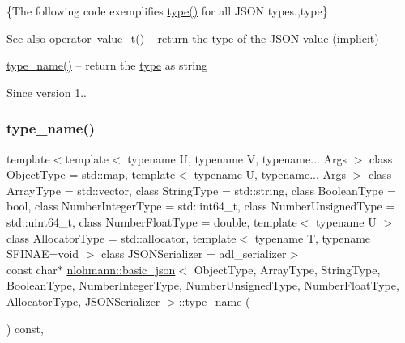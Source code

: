 \{The following code exemplifies {\ttfamily \mbox{\hyperlink{classnlohmann_1_1basic__json_a2b2d781d7f2a4ee41bc0016e931cadf7}{type()}}} for all J\+S\+ON types.,type\}

\begin{DoxySeeAlso}{See also}
\mbox{\hyperlink{classnlohmann_1_1basic__json_a26ef3058e249f82a04f8ec18f7419027}{operator value\+\_\+t()}} -- return the \mbox{\hyperlink{classnlohmann_1_1basic__json_a2b2d781d7f2a4ee41bc0016e931cadf7}{type}} of the J\+S\+ON \mbox{\hyperlink{classnlohmann_1_1basic__json_adcf8ca5079f5db993820bf50036bf45d}{value}} (implicit) 

\mbox{\hyperlink{classnlohmann_1_1basic__json_a9d0a478571f82f0163b96b2424cd998f}{type\+\_\+name()}} -- return the \mbox{\hyperlink{classnlohmann_1_1basic__json_a2b2d781d7f2a4ee41bc0016e931cadf7}{type}} as string
\end{DoxySeeAlso}
\begin{DoxySince}{Since}
version 1.. 
\end{DoxySince}
\mbox{\label{classnlohmann_1_1basic__json_a9d0a478571f82f0163b96b2424cd998f}} 
\subsubsection{\texorpdfstring{type\+\_\+name()}{type\_name()}}
{\footnotesize\ttfamily template$<$template$<$ typename U, typename V, typename... Args $>$ class Object\+Type = std\+::map, template$<$ typename U, typename... Args $>$ class Array\+Type = std\+::vector, class String\+Type  = std\+::string, class Boolean\+Type  = bool, class Number\+Integer\+Type  = std\+::int64\+\_\+t, class Number\+Unsigned\+Type  = std\+::uint64\+\_\+t, class Number\+Float\+Type  = double, template$<$ typename U $>$ class Allocator\+Type = std\+::allocator, template$<$ typename T, typename S\+F\+I\+N\+A\+E=void $>$ class J\+S\+O\+N\+Serializer = adl\+\_\+serializer$>$ \\
const char$\ast$ \mbox{\hyperlink{classnlohmann_1_1basic__json}{nlohmann\+::basic\+\_\+json}}$<$ Object\+Type, Array\+Type, String\+Type, Boolean\+Type, Number\+Integer\+Type, Number\+Unsigned\+Type, Number\+Float\+Type, Allocator\+Type, J\+S\+O\+N\+Serializer $>$\+::type\+\_\+name (\begin{DoxyParamCaption}{ }\end{DoxyParamCaption}) const\hspace{0.3cm}{\ttfamily [inline]}, {\ttfamily [noexcept]}}



